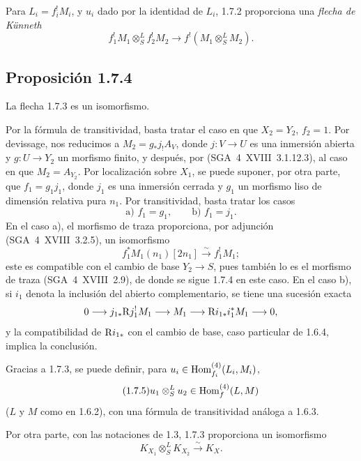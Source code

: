 Para $L_i=f_i^{!}M_i$, y $u_i$ dado por la identidad de $L_i$, 1.7.2 proporciona una \emph{flecha de Künneth}
\begin{equation}\tag{1.7.3}
f_1^{!}M_1\otimes^{L}_{S}f_2^{!}M_2\longrightarrow f^{!}(M_1\otimes^{L}_{S}M_2).
\end{equation}

\subsection*{Proposición 1.7.4}
La flecha 1.7.3 es un isomorfismo.

Por la fórmula de transitividad, basta tratar el caso en que $X_2=Y_2$, $f_2=1$. Por devissage, nos reducimos a $M_2=g_{*}j_{!}A_V$, donde $j:V\to U$ es una inmersión abierta y $g:U\to Y_2$ un morfismo finito, y después, por (SGA~4~XVIII~3.1.12.3), al caso en que $M_2=A_{Y_2}$. Por localización sobre $X_1$, se puede suponer, por otra parte, que $f_1=g_1j_1$, donde $j_1$ es una inmersión cerrada y $g_1$ un morfismo liso de dimensión relativa pura $n_1$. Por transitividad, basta tratar los casos
\[
\text{a) } f_1=g_1,\qquad \text{b) } f_1=j_1.
\]
En el caso a), el morfismo de traza proporciona, por adjunción (SGA~4~XVIII~3.2.5), un isomorfismo
\[
f_1^{*}M_1(n_1)[2n_1]\xrightarrow{\sim}f_1^{!}M_1;
\]
este es compatible con el cambio de base $Y_2\to S$, pues también lo es el morfismo de traza (SGA~4~XVIII~2.9), de donde se sigue 1.7.4 en este caso. En el caso b), si $i_1$ denota la inclusión del abierto complementario, se tiene una sucesión exacta
\[
0\longrightarrow j_{1*}\mathrm{R} j_1^{!}M_1\longrightarrow M_1\longrightarrow \mathrm{R} i_{1*}i_1^{*}M_1\longrightarrow0,
\]
y la compatibilidad de $\mathrm{R} i_{1*}$ con el cambio de base, caso particular de 1.6.4, implica la conclusión.

Gracias a 1.7.3, se puede definir, para $u_i\in\operatorname{Hom}_{f_i}^{(4)}(L_i,M_i)$,
\begin{equation}\tag{1.7.5}
u_1\otimes^{L}_{S}u_2\in\operatorname{Hom}_f^{(4)}(L,M)
\end{equation}
($L$ y $M$ como en 1.6.2), con una fórmula de transitividad análoga a 1.6.3.

Por otra parte, con las notaciones de 1.3, 1.7.3 proporciona un isomorfismo
\begin{equation}\tag{1.7.6}
K_{X_1}\otimes^{L}_{S}K_{X_2}\xrightarrow{\sim}K_X.
\end{equation}


